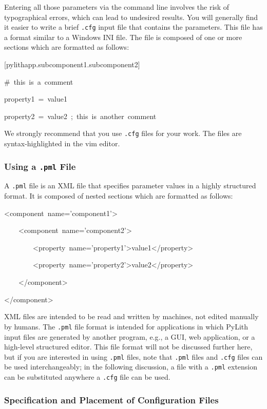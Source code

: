 Entering all those parameters via the command line involves the risk
of typographical errors, which can lead to undesired results. You
will generally find it easier to write a brief \texttt{.cfg} input
file that contains the parameters. This file has a format similar
to a Windows INI file. The file is composed of one or more sections
which are formatted as follows:
\begin{lyxcode}
{[}pylithapp.subcomponent1.subcomponent2{]}

\#~this~is~a~comment

property1~=~value1

property2~=~value2~;~this~is~another~comment
\end{lyxcode}
We strongly recommend that you use \texttt{.cfg} files for your work.
The files are syntax-highlighted in the vim editor.


\subsubsection{Using a \texttt{.pml} File}

A \texttt{.pml} file is an XML file that specifies parameter values
in a highly structured format. It is composed of nested sections which
are formatted as follows:
\begin{lyxcode}
<component~name='component1'>

~~~~<component~name='component2'>

~~~~~~~~<property~name='property1'>value1</property>

~~~~~~~~<property~name='property2'>value2</property>

~~~~</component>

</component>
\end{lyxcode}
XML files are intended to be read and written by machines, not edited
manually by humans. The \texttt{.pml} file format is intended for
applications in which PyLith input files are generated by another
program, e.g., a GUI, web application, or a high-level structured
editor. This file format will not be discussed further here, but if
you are interested in using \texttt{.pml} files, note that \texttt{.pml}
files and \texttt{.cfg} files can be used interchangeably; in the
following discussion, a file with a \texttt{.pml} extension can be
substituted anywhere a \texttt{.cfg} file can be used.


\subsubsection{Specification and Placement of Configuration Files}

